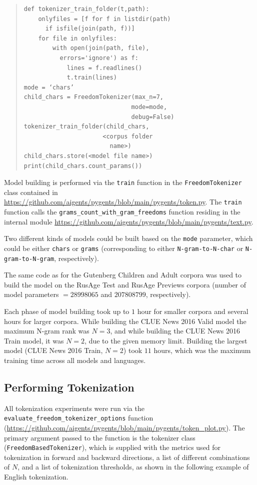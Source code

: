 \documentclass[11pt]{article}
\begin{document}
\begin{quote}\begin{small}
\begin{verbatim}
def tokenizer_train_folder(t,path):
    onlyfiles = [f for f in listdir(path) 
      if isfile(join(path, f))]
    for file in onlyfiles:
        with open(join(path, file),
          errors='ignore') as f:
            lines = f.readlines()
            t.train(lines)
mode = ‘chars’
child_chars = FreedomTokenizer(max_n=7,
                              mode=mode,
                              debug=False)
tokenizer_train_folder(child_chars,
                      <corpus folder
                        name>)
child_chars.store(<model file name>)
print(child_chars.count_params())
\end{verbatim}
\end{small}\end{quote}

Model building is performed via the \texttt{train} function in the \texttt{FreedomTokenizer} class contained in \url{https://github.com/aigents/pygents/blob/main/pygents/token.py}. The \texttt{train} function calls the \texttt{grams\_count\_with\_gram\_freedoms} function residing in the internal module \url{https://github.com/aigents/pygents/blob/main/pygents/text.py}.

Two different kinds of models could be built based on the \texttt{mode} parameter, which could be either \texttt{chars} or \texttt{grams} (corresponding to either \texttt{N-gram-to-N-char} or \texttt{N-gram-to-N-gram}, respectively). 

The same code as for the Gutenberg Children and Adult corpora was used to build the model on the RusAge Test and RusAge Previews corpora (number of model parameters $ = 28998065$ and $207808799$, respectively).

Each phase of model building took up to $1$ hour for smaller corpora and several hours for larger corpora. While building the CLUE News 2016 Valid model the maximum N-gram rank was $N=3$, and while building the CLUE News 2016 Train model, it was $N=2$, due to the given memory limit. Building the largest model (CLUE News 2016 Train, $N=2$) took $11$ hours, which was the maximum training time across all models and languages.

\subsection{Performing Tokenization}

All tokenization experiments were run via the \texttt{evaluate\_freedom\_tokenizer\_options} function (\url{https://github.com/aigents/pygents/blob/main/pygents/token_plot.py}). The primary argument passed to the function is the tokenizer class (\texttt{FreedomBasedTokenizer}), which is supplied with the metrics used for tokenization in forward and backward directions, a list of different combinations of $N$, and a list of tokenization thresholds, as shown in the following example of English tokenization.
\end{document}
